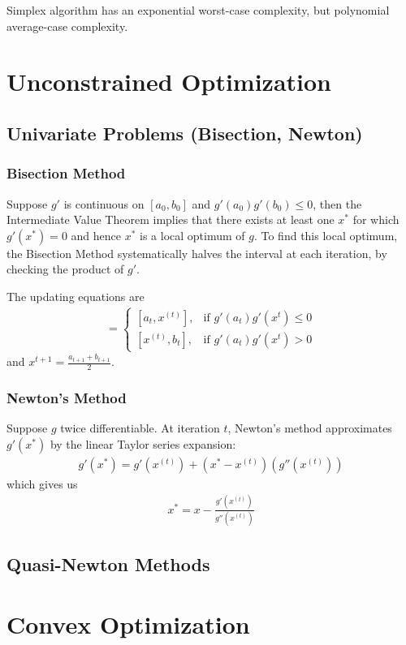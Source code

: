 \documentclass{memoir}
\begin{document}




Simplex algorithm has an exponential worst-case complexity, but polynomial average-case complexity.

\chapter{Unconstrained Optimization}
\section{Univariate Problems (Bisection, Newton)}
\subsection{Bisection Method}
Suppose $g'$ is continuous on $[a_0,b_0]$ and $g'(a_0)g'(b_0) \le 0$, then the Intermediate Value Theorem implies that there exists at least one $x^*$ for which $g'(x^*) = 0$ and hence $x^*$ is a local optimum of $g$. To find this local optimum, the Bisection Method systematically halves the interval at each iteration, by checking the product of $g'$.

The updating equations are
\begin{align}
[a_{t+1},b_{t+1}] =
	\begin{cases}
		[a_t,x^{(t)}], & \mbox{if } g'(a_t)g'(x^{t}) \le 0 \\
		[x^{(t)},b_t], & \mbox{if } g'(a_t)g'(x^{t}) > 0
	\end{cases}
\end{align}
and $x^{t+1} = \frac{a_{t+1}+b_{t+1}}{2}$.

\subsection{Newton's Method}
Suppose $g$ twice differentiable. At iteration $t$, Newton's method approximates $g'(x^*)$ by the linear Taylor series expansion:
\begin{align}
	g'(x^*) = g'(x^{(t)}) + (x^*-x^{(t)})(g''(x^{(t)}))
\end{align}
which gives us
\begin{align}
	x^* = x - \frac{g'(x^{(t)})}{g''(x^{(t)})}
\end{align}

\section{Quasi-Newton Methods}

\chapter{Convex Optimization}
\end{document}
